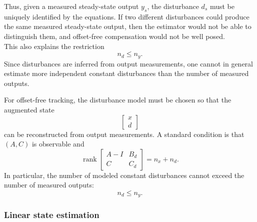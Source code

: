 Thus, given a measured steady-state output \(y_s\), the disturbance \(d_s\) must be uniquely
identified by the equations. If two different disturbances could produce the same measured
steady-state output, then the estimator would not be able to distinguish them, and offset-free
compensation would not be well posed.\\
This also explains the restriction
\[
    n_d \le n_y.
\]
Since disturbances are inferred from output measurements, one cannot in general estimate more
independent constant disturbances than the number of measured outputs.

\begin{theorembox}
For offset-free tracking, the disturbance model must be chosen so that the augmented state
\[
    \begin{bmatrix}x\\ d\end{bmatrix}
\]
can be reconstructed from output measurements. A standard condition is that \((A,C)\) is
observable and
\[
    \operatorname{rank}
    \begin{bmatrix}
        A-I & B_d\\
        C   & C_d
    \end{bmatrix}
    =
    n_x+n_d.
\]
In particular, the number of modeled constant disturbances cannot exceed the number of
measured outputs:
\[
    n_d\le n_y.
\]
\end{theorembox}

\subsubsection{Linear state estimation}

